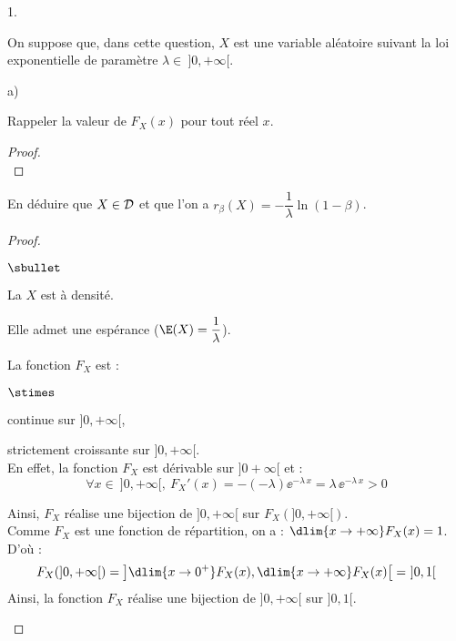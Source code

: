 \documentclass[11pt]{article}%
\begin{document}
\begin{noliste}{1.}
  \setlength{\itemsep}{4mm}
  \setcounter{enumi}{1}
  \item On suppose que, dans cette question, $X$ est une variable 
  aléatoire suivant la loi exponentielle de paramètre $\lambda \in 
  \ ]0,+\infty[$.
  \begin{noliste}{a)}
    \setlength{\itemsep}{2mm}
    \item Rappeler la valeur de $F_X(x)$ pour tout réel $x$.
    
    \begin{proof}~
      ~\\[-1cm]
    \end{proof}

    
    \item En déduire que $X \in {\cal D}$ et que l'on a 
    $r_\beta(X)=-\dfrac1\lambda \ln(1-\beta)$.
    
    \begin{proof}~
      \begin{noliste}{$\sbullet$}
	\item La \var $X$ est à densité.
	\item Elle admet une espérance ($\E(X) = \dfrac{1}{\lambda}$).
	
	
	
	
	\item La fonction $F_X$ est :
	\begin{noliste}{$\stimes$}
	  \item continue sur $]0,+\infty[$,
	  \item strictement croissante sur $]0,+\infty[$.\\
	  En effet, la fonction $F_X$ est dérivable sur 
	  $]0+\infty[$ et :
	  \[
	    \forall x \in \ ]0,+\infty[, \ 
	    F_X'(x) = -(-\lambda) \ee^{-\lambda \, x} = 
	    \lambda \, \ee^{-\lambda \, x} >0
	  \]
	\end{noliste}
	Ainsi, $F_X$ réalise une bijection de $]0,+\infty[$ sur 
	$F_X(]0,+\infty[)$.\\
	Comme $F_X$ est une fonction de répartition, on a :
	$\dlim{x\to +\infty} F_X(x)=1$.\\
	D'où :
	\[
	  F_X(]0,+\infty[) = \left] \dlim{x\to 0^+} F_X(x), 
	  \dlim{x\to +\infty} F_X(x) \right[ = \ ]0,1[
	\]
	Ainsi, la fonction $F_X$ réalise une bijection de 
	$]0,+\infty[$ sur $]0,1[$.
      \end{noliste}
      

\end{proof}
\end{noliste}
\end{noliste}
\end{document}

